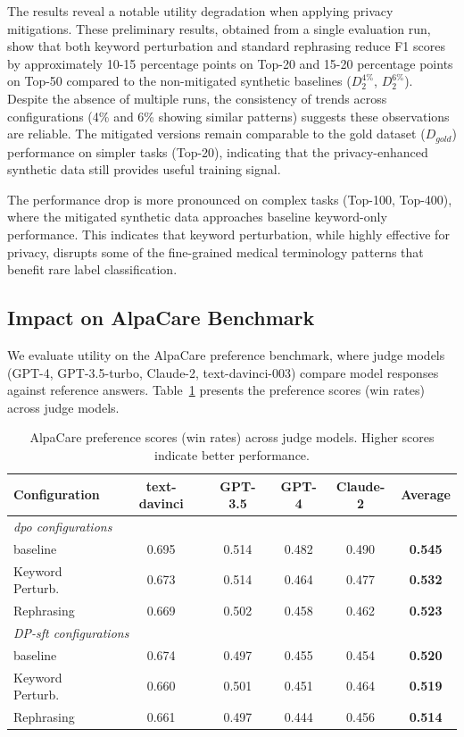 The results reveal a notable utility degradation when applying privacy mitigations. These preliminary results, obtained from a single evaluation run, show that both keyword perturbation and standard rephrasing reduce F1 scores by approximately 10-15 percentage points on Top-20 and 15-20 percentage points on Top-50 compared to the non-mitigated synthetic baselines ($D_{2}^{4\%}$, $D_{2}^{6\%}$). Despite the absence of multiple runs, the consistency of trends across configurations (4\% and 6\% showing similar patterns) suggests these observations are reliable. The mitigated versions remain comparable to the gold dataset ($D_{gold}$) performance on simpler tasks (Top-20), indicating that the privacy-enhanced synthetic data still provides useful training signal.

The performance drop is more pronounced on complex tasks (Top-100, Top-400), where the mitigated synthetic data approaches baseline keyword-only performance. This indicates that keyword perturbation, while highly effective for privacy, disrupts some of the fine-grained medical terminology patterns that benefit rare label classification.

\subsection{Impact on AlpaCare Benchmark}
\label{subsec:alpacare_utility}

We evaluate utility on the AlpaCare preference benchmark, where judge models (GPT-4, GPT-3.5-turbo, Claude-2, text-davinci-003) compare model responses against reference answers. Table~\ref{tab:alpacare_utility} presents the preference scores (win rates) across judge models.

\begin{table}[h]
\centering
\begin{tabular}{lccccc}
\toprule
\textbf{Configuration} & \textbf{text-davinci} & \textbf{GPT-3.5} & \textbf{GPT-4} & \textbf{Claude-2} & \textbf{Average} \\
\midrule
\multicolumn{6}{l}{\textit{\gls{dpo} configurations}} \\
baseline & 0.695 & 0.514 & 0.482 & 0.490 & \textbf{0.545} \\
Keyword Perturb. & 0.673 & 0.514 & 0.464 & 0.477 & \textbf{0.532} \\
Rephrasing & 0.669 & 0.502 & 0.458 & 0.462 & \textbf{0.523} \\
\midrule
\multicolumn{6}{l}{\textit{DP-\gls{sft} configurations}} \\
baseline & 0.674 & 0.497 & 0.455 & 0.454 & \textbf{0.520} \\
Keyword Perturb. & 0.660 & 0.501 & 0.451 & 0.464 & \textbf{0.519} \\
Rephrasing & 0.661 & 0.497 & 0.444 & 0.456 & \textbf{0.514} \\
\bottomrule
\end{tabular}
\caption{AlpaCare preference scores (win rates) across judge models. Higher scores indicate better performance.}
\label{tab:alpacare_utility}
\end{table}

